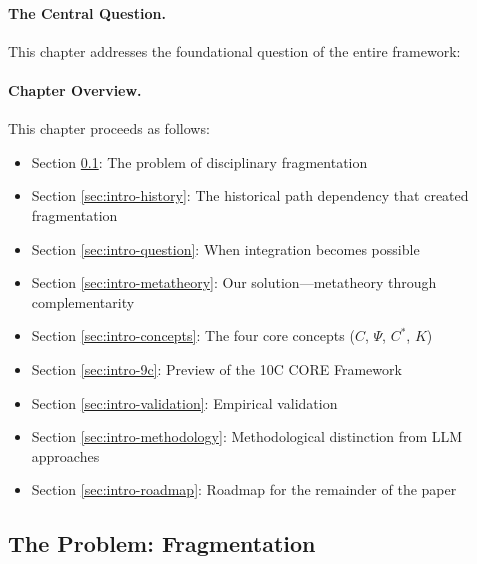 \paragraph{The Central Question.}
This chapter addresses the foundational question of the entire framework:

\begin{center}
\end{center}

\paragraph{Chapter Overview.}
\label{sec:intro-overview}
This chapter proceeds as follows:
\begin{itemize}
    \item Section \ref{sec:intro-problem}: The problem of disciplinary fragmentation
    \item Section \ref{sec:intro-history}: The historical path dependency that created fragmentation
    \item Section \ref{sec:intro-question}: When integration becomes possible
    \item Section \ref{sec:intro-metatheory}: Our solution---metatheory through complementarity
    \item Section \ref{sec:intro-concepts}: The four core concepts ($C$, $\Psi$, $C^*$, $K$)
    \item Section \ref{sec:intro-9c}: Preview of the 10C CORE Framework
    \item Section \ref{sec:intro-validation}: Empirical validation
    \item Section \ref{sec:intro-methodology}: Methodological distinction from LLM approaches
    \item Section \ref{sec:intro-roadmap}: Roadmap for the remainder of the paper
\end{itemize}

\subsection{The Problem: Fragmentation}
\label{sec:intro-problem}

